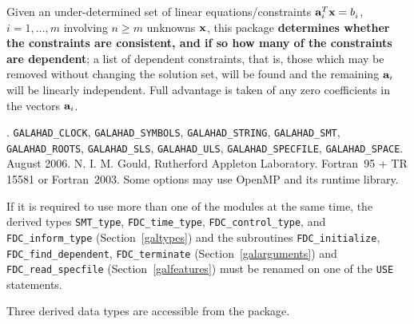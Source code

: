 \documentclass{galahad}
\newcommand{\packagename}{FDC}
\newcommand{\fullpackagename}{\libraryname\_\-\packagename}
\begin{document}
\galheader


\galsummary
Given an under-determined set of linear equations/constraints
${\mathbf{a}}_i^T {\mathbf{x}} = b_i^{}$,
$i = 1, \ldots, m$ involving $n \geq m$ unknowns ${\mathbf{x}}$, this package
{\bf determines whether the constraints are consistent, and if so how many
of the constraints are dependent}; a list of dependent constraints, that
is, those which may be removed without changing the solution set, will be found
and the remaining ${\mathbf{a}}_i$ will be linearly independent.
Full advantage is taken of any zero coefficients in the vectors ${\mathbf{a}}_i$.


\galattributes
\galversions{\tt  \fullpackagename\_single, \fullpackagename\_double}.
\galuses
{\tt GALAHAD\_\-CLOCK},
{\tt GALAHAD\_SY\-M\-BOLS}, {\tt GALAHAD\_\-STRING},
{\tt GALAHAD\_SMT}, {\tt GALAHAD\_\-ROOTS}, {\tt GALAHAD\_\-SLS},
{\tt GALAHAD\_\-ULS}, {\tt GALAHAD\_SPECFILE}, {\tt GALAHAD\-\_SPACE}.
\galdate August  2006.
\galorigin N. I. M. Gould, Rutherford Appleton Laboratory.
\gallanguage Fortran~95 + TR 15581 or Fortran~2003.
\galparallelism Some options may use OpenMP and its runtime library.


\galhowto



\noindent
If it is required to use more than one of the modules at the same time, 
the derived types
{\tt SMT\_type},
{\tt \packagename\_time\_type},
{\tt \packagename\_control\_type},
and
{\tt \packagename\_inform\_type}
(Section~\ref{galtypes})
and the subroutines
{\tt \packagename\_initialize},
{\tt \packagename\_\-find\_dependent},
{\tt \packagename\_terminate}
(Section~\ref{galarguments})
and
{\tt \packagename\_read\_specfile}
(Section~\ref{galfeatures})
must be renamed on one of the {\tt USE} statements.








\galtypes
Three derived data types are accessible from the package.
\end{document}
